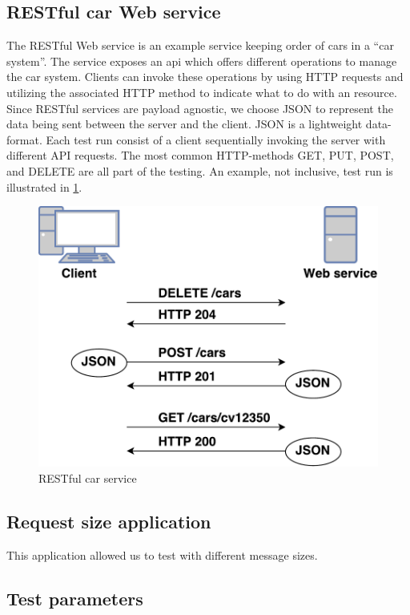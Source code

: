 \subsection{RESTful car Web service}

The RESTful Web service is an example service keeping order of cars in a ``car
system''. The service exposes an \gls{api} which offers different operations to
manage the car system. Clients can invoke these operations by using HTTP
requests and utilizing the associated HTTP method to indicate what to do with an
resource. Since RESTful services are payload agnostic, we choose JSON to
represent the data being sent between the server and the client. JSON is a
lightweight data-format. Each test run consist of a client sequentially invoking
the server with different API requests. The most common HTTP-methods GET, PUT,
POST, and DELETE are all part of the testing. An example, not inclusive, test run
is illustrated in \cref{figure-rest-flow}.

\begin{figure}[h]
\centering
\includegraphics[scale=0.6]{images/rest_flow.pdf}
\caption{RESTful car service}
\label{figure-rest-flow}
\end{figure}


\subsection{Request size application}

This application allowed us to test with different message sizes.

\subsection{Test parameters}

